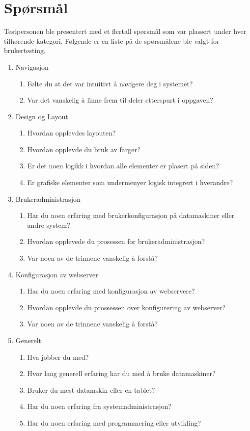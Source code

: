 \section{Spørsmål}
Testpersonen ble presentert med et flertall spørsmål som var plassert under hver tilhørende kategori. 
Følgende er en liste på de spørsmålene ble valgt for brukertesting.
\begin{enumerate}
\setlength{\itemsep}{1pt}
\setlength{\parskip}{0pt}
\setlength{\parsep}{0pt}
\item Navigasjon
\begin{enumerate}
\item Følte du at det var intuitivt å navigere deg i systemet?
\item Var det vanskelig å finne frem til deler etterspurt i oppgaven?
\end{enumerate}
\item Design og Layout
\begin{enumerate}
\item Hvordan opplevdes layouten?
\item Hvordan opplevde du bruk av farger?
\item Er det noen logikk i hvordan alle elementer er plasert på siden?
\item Er grafiske elementer som undermenyer logisk integrert i hverandre?
\end{enumerate}
\item Brukeradministrasjon
\begin{enumerate}
\item Har du noen erfaring med brukerkonfigurasjon på datamaskiner eller andre system?
\item Hvordan opplevede du prosessen for brukeradministrasjon?
\item Var noen av de trinnene vanskelig å forstå?
\end{enumerate}
\item Konfigurasjon av webserver
\begin{enumerate}
\item Har du noen erfaring med konfigurasjon av webservere?
\item Hvordan opplevde du prossessen over konfigurering av webserver?
\item Var noen av de trinnene vanskelig å forstå?
\end{enumerate}
\item Generelt
\begin{enumerate}
\item Hva jobber du med?
\item Hvor lang generell erfaring har du med å bruke datamaskiner?
\item Bruker du mest datamskin eller en tablet?
\item Har du noen erfaring fra systemadministrasjon?
\item Har du noen erfaring med programmering eller utvikling?
\end{enumerate}
\end{enumerate}

